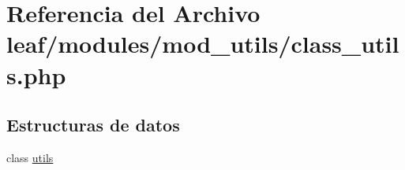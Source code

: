 \hypertarget{class__utils_8php}{\section{Referencia del Archivo leaf/modules/mod\-\_\-utils/class\-\_\-utils.php}
\label{class__utils_8php}
}
\subsection*{Estructuras de datos}
\begin{DoxyCompactItemize}
\item 
class \hyperlink{classutils}{utils}
\end{DoxyCompactItemize}
